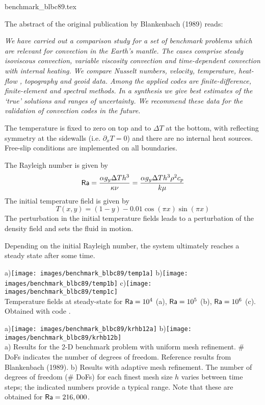 \begin{flushright} {\tiny {\color{gray} benchmark\_blbc89.tex}} \end{flushright}

The abstract of the original publication by Blankenbach \etal (1989) \cite{blbc89} reads:
\begin{center}
{\it 
We have carried out a comparison study for a set of benchmark problems 
which are relevant for convection in the Earth's mantle. The cases comprise 
steady isoviscous convection, variable viscosity convection and time-dependent 
convection with internal heating. We compare Nusselt numbers, velocity, 
temperature, heat-flow , topography and geoid data. Among the applied codes 
are finite-difference, finite-element and spectral methods. In a synthesis 
we give best estimates of the `true' solutions and ranges of uncertainty. We
recommend these data for the validation of convection codes in the future.
}
\end{center}

The temperature is fixed to zero on top and to $\Delta T$ at the bottom, 
with reflecting symmetry at the sidewalls (i.e. $\partial_x T=0$) 
and there are no internal heat sources. 
Free-slip conditions are implemented on all boundaries. 

The Rayleigh number is given by
\[
{\mathsf{Ra}} = \frac{\alpha g_y \Delta T h^3 }{\kappa \nu}
=\frac{\alpha g_y \Delta T h^3 \rho^2 c_p}{k \mu}
\]
The initial temperature field is given by 
\[
T(x,y)=(1-y) - 0.01\cos(\pi x) \sin(\pi x)
\]
The perturbation in the initial temperature fields leads to 
a perturbation of the density field and sets the fluid in motion. 

Depending on the initial Rayleigh number, the system ultimately reaches a 
steady state after some time. 

\begin{center}
a)\texttt{[image: images/benchmark\_blbc89/temp1a]}
b)\texttt{[image: images/benchmark\_blbc89/temp1b]}
c)\texttt{[image: images/benchmark\_blbc89/temp1c]}\\
{\captionfont Temperature fields at steady-state for 
${\mathsf{Ra}}=10^4$ (a), ${\mathsf{Ra}}=10^5$ (b), ${\mathsf{Ra}}=10^6$ (c).
Obtained with \elefant code \cite{thie14}.}
\end{center}


\begin{center}
a)\texttt{[image: images/benchmark\_blbc89/krhb12a]}
b)\texttt{[image: images/benchmark\_blbc89/krhb12b]}\\
{\captionfont 
a) Results for the 2-D benchmark problem with uniform mesh refinement. 
\# DoFs indicates the number of degrees of freedom.
Reference results from Blankenbach \etal (1989).
b) Results with adaptive mesh refinement. The number of degrees of freedom (\# DoFs) for
each finest mesh size $h$ varies between time steps; 
the indicated numbers provide a typical range.
Note that these are obtained for ${\mathsf{Ra}}=216,000$.}
\end{center}


